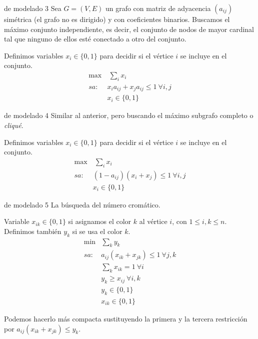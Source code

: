 \documentclass[twoside]{article}
\begin{document}
\begin{ejercicio}{de modelado 3}
Sea $G=(V,E)$ un grafo con matriz de adyacencia $(a_{ij})$ simétrica (el grafo no es dirigido) y con coeficientes binarios. Buscamos el máximo conjunto independiente, es decir, el conjunto de nodos de mayor cardinal tal que ninguno de ellos esté conectado a otro del conjunto.
\end{ejercicio}
\begin{solucion}
Definimos variables $x_i\in\{0,1\}$ para decidir si el vértice $i$ se incluye en el conjunto.
\begin{align*}
\max& \ \sum_i x_i\\
sa:\ &  x_ia_{ij}+x_ja_{ij}\leq 1\ \forall i,j\\
& x_i\in\{0,1\} 
\end{align*}
\end{solucion}

\newpage

\begin{ejercicio}{de modelado 4}
Similar al anterior, pero buscando el máximo subgrafo completo o \emph{cliqué}.
\end{ejercicio}
\begin{solucion}
Definimos variables $x_i\in\{0,1\}$ para decidir si el vértice $i$ se incluye en el conjunto.
\begin{align*}
\max& \ \sum_i x_i\\
sa:\ &(1-a_{ij})(x_i+x_j)\leq 1\ \forall i,j\\
& x_i\in\{0,1\} 
\end{align*}
\end{solucion}

\newpage

\begin{ejercicio}{de modelado 5}
La búsqueda del número cromático. 
\end{ejercicio}
\begin{solucion}
Variable $x_{ik}\in\{0,1\}$ si asignamos el color $k$ al vértice $i$, con $1\leq i,k\leq n$.  Definimos también $y_k$ si se usa el color $k$. 
\begin{align*}
\min & \sum_k y_k\\
sa:\ & a_{ij}(x_{ik}+x_{jk})\leq 1\ \forall j,k\\
     & \sum_k x_{ik}=1\ \forall i\\
    & y_k\geq x_{ij}\ \forall i, k\\
    & y_k\in\{0,1\}\\
    & x_{ik}\in\{0,1\}
\end{align*}
\end{solucion}
Podemos hacerlo más compacta sustituyendo la primera y la tercera restricción por $a_{ij}(x_{ik}+x_{jk})\leq y_k$. 
\end{document}
